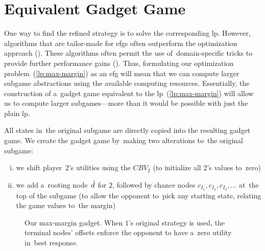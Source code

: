 \section{Equivalent Gadget Game}
One way to find the refined strategy is to solve the corresponding \acrfull{lp}.
However, algorithms that are tailor-made for \acrshort{efg}s often outperform the optimization approach (\cite{Bosansky2013solving}).
These algorithms often permit the use of~domain-specific tricks to provide further performance gains (\cite{Johanson2012efficient}).
Thus, formulating our optimization problem~(\ref{lp:max-margin}) as an \acrshort{efg} will mean that we can compute larger subgame abstractions using the available computing resources.
Essentially, the construction of a~gadget game equivalent to the \acrshort{lp}~(\ref{lp:max-margin}) will allow us to compute larger subgames---more than it would be possible with just the plain \acrshort{lp}.

All states in~the original subgame are directly copied into the resulting gadget game.
We create the gadget game by~making two alterations to~the original subgame:
\begin{enumerate}[(i)]
  \item we shift player~$2$'s utilities using the $CBV_2$ (to initialize all $2$'s values to~zero)
  \item we add a~rooting node~$\tilde{d}$ for $2$, followed by chance nodes $c_{I_1}, c_{I_2}, c_{I_3}, \dots$ at~the top of the subgame (to allow the opponent to~pick any starting state, relating the game values to~the margin)
\end{enumerate}

\begin{figure}[H]
  \centering
  \def\svgwidth{.4\textwidth}
  
  \def\captionTitle{Our max-margin gadget}
  \caption[\captionTitle]{\captionTitle. When $1$'s original strategy is used, the terminal nodes' offsets enforce the opponent to have a~zero utility in~best response.}
  \label{fig:max-margin-gadget}
\end{figure}

